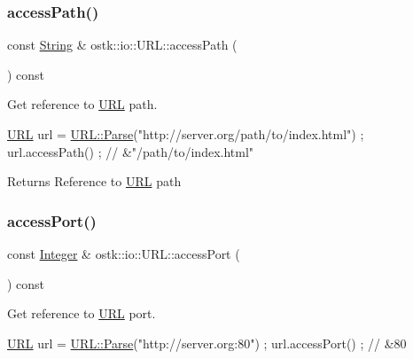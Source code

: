 \subsubsection{\texorpdfstring{access\+Path()}{accessPath()}}
{\footnotesize\ttfamily const \hyperlink{namespaceostk_1_1io_a95d49b120613a7610cb1b4f03b1116b6}{String} \& ostk\+::io\+::\+U\+R\+L\+::access\+Path (\begin{DoxyParamCaption}{ }\end{DoxyParamCaption}) const}



Get reference to \hyperlink{classostk_1_1io_1_1_u_r_l}{U\+RL} path. 


\begin{DoxyCode}
\hyperlink{classostk_1_1io_1_1_u_r_l_a2537e046cef4ac966cc295abb81279c2}{URL} url = \hyperlink{classostk_1_1io_1_1_u_r_l_a1cd7216bb1079f62386a218ba510958d}{URL::Parse}(\textcolor{stringliteral}{"http://server.org/path/to/index.html"}) ;
url.accessPath() ; \textcolor{comment}{// &"/path/to/index.html"}
\end{DoxyCode}


\begin{DoxyReturn}{Returns}
Reference to \hyperlink{classostk_1_1io_1_1_u_r_l}{U\+RL} path 
\end{DoxyReturn}
\mbox{\label{classostk_1_1io_1_1_u_r_l_a143ce5446cddd58318ba77d425b4f7e4}} 
\subsubsection{\texorpdfstring{access\+Port()}{accessPort()}}
{\footnotesize\ttfamily const \hyperlink{namespaceostk_1_1io_a35328f680550d000b2754860bbe1d268}{Integer} \& ostk\+::io\+::\+U\+R\+L\+::access\+Port (\begin{DoxyParamCaption}{ }\end{DoxyParamCaption}) const}



Get reference to \hyperlink{classostk_1_1io_1_1_u_r_l}{U\+RL} port. 


\begin{DoxyCode}
\hyperlink{classostk_1_1io_1_1_u_r_l_a2537e046cef4ac966cc295abb81279c2}{URL} url = \hyperlink{classostk_1_1io_1_1_u_r_l_a1cd7216bb1079f62386a218ba510958d}{URL::Parse}(\textcolor{stringliteral}{"http://server.org:80"}) ;
url.accessPort() ; \textcolor{comment}{// &80}
\end{DoxyCode}



